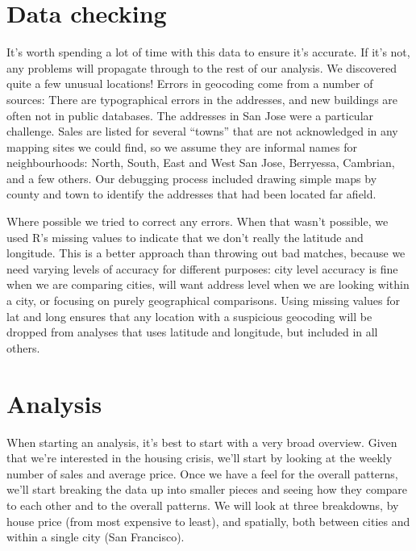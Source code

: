 \documentclass[oneside]{article}
\begin{document}

\section{Data checking}

It's worth spending a lot of time with this data to ensure it's accurate.  If it's not, any problems will propagate through to the rest of our analysis.  We discovered quite a few unusual locations!  Errors in geocoding come from a number of sources:  There are typographical errors in the addresses, and new buildings are often not in public databases.  The addresses in San Jose were a particular challenge.  Sales are listed for several ``towns'' that are not acknowledged in any mapping sites we could find, so we assume they are informal names for neighbourhoods: North, South, East and West San Jose, Berryessa, Cambrian, and a few others.  Our debugging process included drawing simple maps by county and town to identify the addresses that had been located far afield.

Where possible we tried to correct any errors.  When that wasn't possible, we used R's missing values to indicate that we don't really the latitude and longitude.  This is a better approach than throwing out bad matches, because we need varying levels of accuracy for different  purposes: city level accuracy is fine when we are comparing cities, will want address level when we are looking within a city, or focusing on purely geographical comparisons.  Using missing values for lat and long ensures that any location with a suspicious geocoding will be dropped from analyses that uses latitude and longitude, but included in all others.

\section{Analysis}

When starting an analysis, it's best to start with a very broad overview.  Given that we're interested in the housing crisis, we'll start by looking at the weekly number of sales and average price.  Once we have a feel for the overall patterns, we'll start breaking the data up into smaller pieces and seeing how they compare to each other and to the overall patterns.  We will look at three breakdowns, by house price (from most expensive to least), and spatially, both between cities and within a single city (San Francisco).
\end{document}

